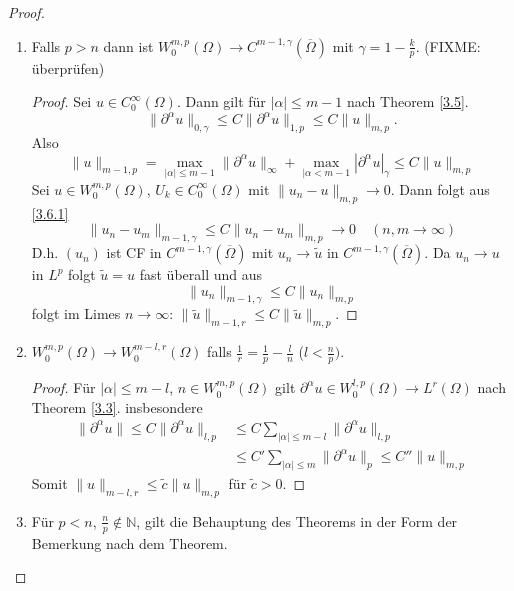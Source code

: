 \documentclass[
paper=a4,
bibtotocnumbered,
liststotocnumbered,
tablecaptionabove,
pointlessnumbers,
twoside,
openright,
10pt
]
{report}
\theoremstyle{definition}
\numberwithin{equation}{chapter}
\begin{document}
 \begin{proof}
 \begin{enumerate}
 	\item Falls $p>n$ dann ist $W_0^{m,p}(\Omega) \to C^{m-1, \gamma} (\overline\Omega)$ mit $\gamma = 1- \frac{k}{p}$. (FIXME: überprüfen)
 	\begin{proof}
		Sei $u\in C_0^\infty(\Omega)$. Dann gilt für $|\alpha|\le m-1$ nach Theorem \ref{3.5}.
		\begin{equation}
			\|\partial^\alpha u\|_{0,\gamma} \le C \| \partial^\alpha u\|_{1,p} \le C\| u \|_{m,p}.
		\end{equation}
		Also
		\begin{equation}\label{3.6.1}
			\|u\|_{m-1,p} = \max_{|\alpha|\le m-1} \| \partial^\alpha u \|_\infty + \max_{|\alpha < m-1} | \partial^\alpha u|_\gamma \le C\| u \|_{m,p}
		\end{equation}
		Sei $u\in W_0^{m,p}(\Omega)$, $U_k \in C_0^\infty(\Omega)$ mit $\| u_n - u\|_{m,p} \to 0$. Dann folgt aus \eqref{3.6.1}
		\begin{equation}
			\| u_n - u_m \|_{m-1, \gamma} \le C \| u_n - u_m \|_{m,p} \to 0 \quad (n,m\to \infty)
		\end{equation}
		D.h. $(u_n)$ ist CF in $C^{m-1, \gamma}(\overline{\Omega})$ mit $u_n \to \tilde u$ in $C^{m-1, \gamma}(\overline{\Omega})$. Da $u_n \to u$ in $L^p$ folgt $\tilde u = u$ fast überall und aus
		\begin{equation}
			\| u_n \|_{m-1, \gamma} \le C \| u_n \|_{m,p}
		\end{equation}
		folgt im Limes $n\to \infty$: $\| \tilde u\|_{m-1, r} \le C\| \tilde u \|_{m,p}$.
 	\end{proof}
 \item $W_0^{m,p}(\Omega) \to W_0^{m-l,r}(\Omega)$ falls $\frac{1}{r} = \frac{1}{p} - \frac{l}{n}$ ($l < \frac{n}{p})$.
	\begin{proof}
		Für $|\alpha|\le m-l$, $n\in W_0^{m,p}(\Omega)$ gilt $\partial^\alpha u \in W_0^{l,p}(\Omega) \to L^r(\Omega)$ nach Theorem \ref{3.3}. insbesondere
		\begin{align*}
			\|\partial^\alpha u \| \le C\| \partial ^\alpha u\|_{l,p}&\le C\sum_{|\alpha|\le m-l} \| \partial^\alpha u\|_{l,p}\\
										 &\le C' \sum_{|\alpha | \le m} \| \partial^\alpha u \|_p \le C'' \| u\|_{m,p} 
		\end{align*}
		Somit $\|u\|_{m-l, r} \le \tilde c \| u\|_{m,p}$ für $\tilde c>0$.
		\end{proof}
	\item Für $p<n$, $\frac{n}{p} \not\in \mathbb N$, gilt die Behauptung des Theorems in der Form der Bemerkung nach dem Theorem.

\end{enumerate}
\end{proof}
\end{document}
